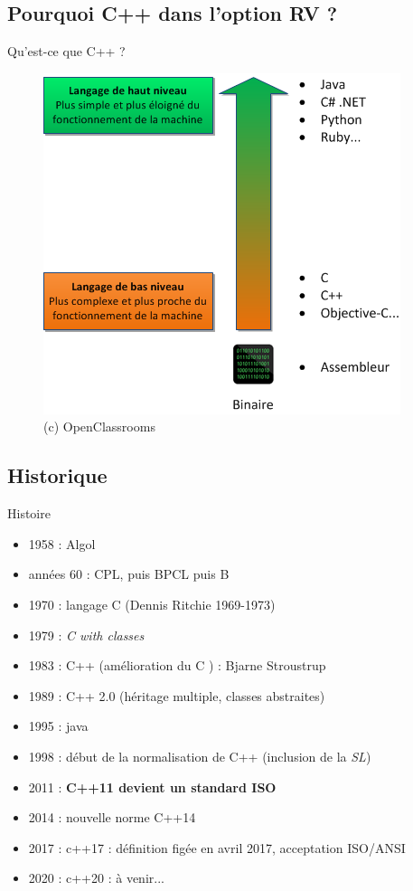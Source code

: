 
\subsection{Pourquoi C++ dans l'option RV ?}

\begin{frame}{Qu'est-ce que C++ ?}
\begin{figure}[htbp]
\begin{center}
   \includegraphics[scale=0.6]{fig/langages.png}
   \caption{(c) OpenClassrooms}
\end{center}
\end{figure}
\end{frame}

\subsection{Historique}

\begin{frame}{Histoire}
\begin{itemize}
\item 1958 : Algol
\item années 60 : CPL, puis BPCL puis B
\item 1970 : langage C (Dennis Ritchie 1969-1973)
\item 1979 : \textit{C with classes}
\item 1983 : C++ (amélioration du C ) : Bjarne Stroustrup
\item 1989 : C++ 2.0 (héritage multiple, classes abstraites)
\item 1995 : java
\item 1998 : début de la normalisation de C++ (inclusion de la \textit{SL})
\item 2011 : \textbf{C++11 devient un standard ISO}
\item 2014 : nouvelle norme C++14
\item 2017 : c++17 : définition figée en avril 2017, acceptation ISO/ANSI
\item 2020 : c++20 : à venir...
\end{itemize}
\end{frame}

